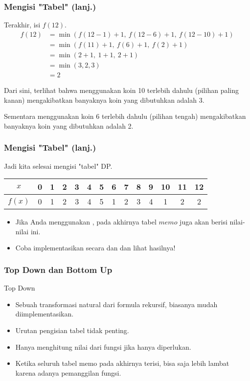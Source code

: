 \begin{frame}
\frametitle{Mengisi "Tabel" (lanj.)}
Terakhir, isi $f(12)$.
\begin{align*}
  f(12) &= \min(f(12-1) + 1, \ f(12-6) + 1, \ f(12-10) + 1) \\
  &= \min(f(11) + 1, \ f(6) + 1, \ f(2) + 1) \\
  &= \min(2 + 1, \ 1 + 1, \ 2 + 1) \\
  &= \min(3, 2, 3) \\
  &= 2
\end{align*}

Dari sini, terlihat bahwa menggunakan koin 10 terlebih dahulu (pilihan paling kanan) mengakibatkan banyaknya koin yang dibutuhkan adalah 3.\newline

Sementara menggunakan koin 6 terlebih dahulu (pilihan tengah) mengakibatkan banyaknya koin yang dibutuhkan adalah 2.
\end{frame}

\begin{frame}
\frametitle{Mengisi "Tabel" (lanj.)}
Jadi kita selesai mengisi "tabel" DP.\newline

\begin{tabular}{|c|c|c|c|c|c|c|c|c|c|c|c|c|c|}
\hline $x$ & 0 & 1 & 2 & 3 & 4 & 5 & 6 & 7 & 8 & 9 & 10 & 11 & 12 \\ 
\hline $f(x)$ &  0 & 1 & 2 & 3 & 4 & 5 & 1 & 2 & 3 & 4 & 1 & 2 & 2 \\ 
\hline 
\end{tabular}
\newline \newline
\begin{itemize}
  \item Jika Anda menggunakan \ftopdown, pada akhirnya tabel $memo$ juga akan berisi nilai-nilai ini.
  \item Coba implementasikan secara \ftopdown dan \fbottomup dan lihat hasilnya!
\end{itemize}
\end{frame}

\begin{frame}
\frametitle{Top Down dan Bottom Up}
Top Down
\begin{itemize}
  \item Sebuah transformasi natural dari formula rekursif, biasanya mudah diimplementasikan.
  \item Urutan pengisian tabel tidak penting.
  \item Hanya menghitung nilai dari fungsi jika hanya diperlukan.
  \item Ketika seluruh tabel memo pada akhirnya terisi, bisa saja lebih lambat karena adanya 
  \foverhead pemanggilan fungsi.
\end{itemize}
\end{frame}

